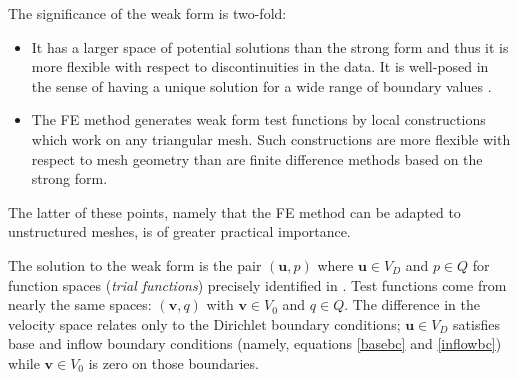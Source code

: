 \documentclass[letterpaper,final,12pt,reqno]{amsart}
\newcommand{\bu}{\mathbf{u}}
\newcommand{\bv}{\mathbf{v}}
\begin{document}
The significance of the weak form is two-fold:
\begin{itemize}
\item It has a larger space of potential solutions than the strong form and thus it is more flexible with respect to discontinuities in the data.  It is well-posed in the sense of having a unique solution  for a wide range of boundary values \cite{JouvetRappaz2011}.
\item The FE method generates weak form test functions by local constructions which work on any triangular mesh.  Such constructions are more flexible with respect to mesh geometry than are finite difference methods based on the strong form.
\end{itemize}
The latter of these points, namely that the FE method can be adapted to unstructured meshes, is of greater practical importance.

The solution to the weak form is the pair $(\bu,p)$ where $\bu\in V_D$ and $p \in Q$ for function spaces (\emph{trial functions}) precisely identified in \cite{JouvetRappaz2011}.  Test functions come from nearly the same spaces: $(\bv,q)$ with $\bv\in V_0$ and $q\in Q$.  The difference in the velocity space relates only to the Dirichlet boundary conditions; $\bu\in V_D$ satisfies base and inflow boundary conditions (namely, equations \eqref{basebc} and \eqref{inflowbc}) while $\bv\in V_0$ is zero on those boundaries.
\end{document}
